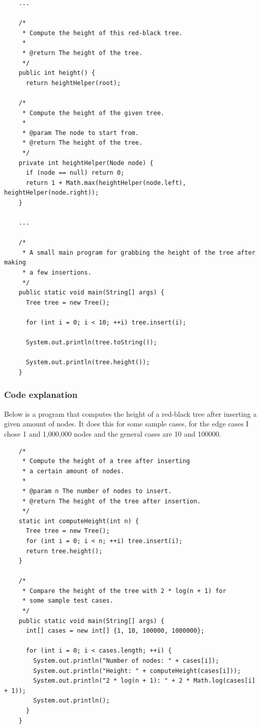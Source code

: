 \documentclass[10pt]{article}
\begin{document}
  \begin{verbatim}
    ...

    /*
     * Compute the height of this red-black tree.
     *
     * @return The height of the tree.
     */
    public int height() {
      return heightHelper(root);

    /*
     * Compute the height of the given tree.
     *
     * @param The node to start from.
     * @return The height of the tree.
     */
    private int heightHelper(Node node) {
      if (node == null) return 0;
      return 1 + Math.max(heightHelper(node.left), heightHelper(node.right));
    }

    ...

    /*
     * A small main program for grabbing the height of the tree after making
     * a few insertions.
     */
    public static void main(String[] args) {
      Tree tree = new Tree();

      for (int i = 0; i < 10; ++i) tree.insert(i);

      System.out.println(tree.toString());

      System.out.println(tree.height());
    }
  \end{verbatim}

  \subsubsection*{Code explanation}


  Below is a program that computes the height of a red-black tree after inserting
  a given amount of nodes. It does this for some sample cases, for the edge cases
  I chose 1 and 1,000,000 nodes and the general cases are 10 and 100000.

  \begin{verbatim}
    /*
     * Compute the height of a tree after inserting
     * a certain amount of nodes.
     *
     * @param n The number of nodes to insert.
     * @return The height of the tree after insertion.
     */
    static int computeHeight(int n) {
      Tree tree = new Tree();
      for (int i = 0; i < n; ++i) tree.insert(i);
      return tree.height();
    }

    /*
     * Compare the height of the tree with 2 * log(n + 1) for
     * some sample test cases.
     */
    public static void main(String[] args) {
      int[] cases = new int[] {1, 10, 100000, 1000000};

      for (int i = 0; i < cases.length; ++i) {
        System.out.println("Number of nodes: " + cases[i]);
        System.out.println("Height: " + computeHeight(cases[i]));
        System.out.println("2 * log(n + 1): " + 2 * Math.log(cases[i] + 1));
        System.out.println();
      }
    }
  \end{verbatim}
\end{document}
